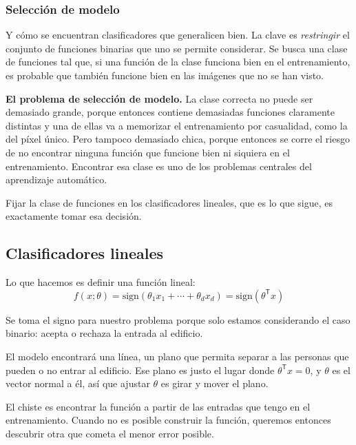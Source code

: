 \documentclass[11pt,letterpaper]{article}
\begin{document}
\subsubsection*{Selección de modelo}

Y cómo se encuentran clasificadores que generalicen bien. La clave es
\emph{restringir} el conjunto de funciones binarias que uno se permite
considerar. Se busca una clase de funciones tal que, si una función de
la clase funciona bien en el entrenamiento, es probable que también
funcione bien en las imágenes que no se han visto.

\begin{idea}
  \textbf{El problema de selección de modelo.} La clase correcta no
  puede ser demasiado grande, porque entonces contiene demasiadas
  funciones claramente distintas y una de ellas va a memorizar el
  entrenamiento por casualidad, como la del píxel único. Pero tampoco
  demasiado chica, porque entonces se corre el riesgo de no encontrar
  ninguna función que funcione bien ni siquiera en el entrenamiento.
  Encontrar esa clase es uno de los problemas centrales del
  aprendizaje automático.
\end{idea}

Fijar la clase de funciones en los clasificadores lineales, que es lo
que sigue, es exactamente tomar esa decisión.


\subsection*{Clasificadores lineales}

Lo que hacemos es definir una función lineal:
\[
    f(x; \theta) = \mathrm{sign}(\theta_1 x_1 + \cdots + \theta_d x_d)
                 = \mathrm{sign}(\theta^{\mathsf{T}} x)
\]

Se toma el signo para nuestro problema porque solo estamos
considerando el caso binario: acepta o rechaza la entrada al edificio.

El modelo encontrará una línea, un plano que permita separar a las
personas que pueden o no entrar al edificio. Ese plano es justo el
lugar donde $\theta^{\mathsf{T}} x = 0$, y $\theta$ es el vector
normal a él, así que ajustar $\theta$ es girar y mover el plano.

El chiste es encontrar la función a partir de las entradas que tengo
en el entrenamiento. Cuando no es posible construir la función,
queremos entonces descubrir otra que cometa el menor error posible.
\end{document}
